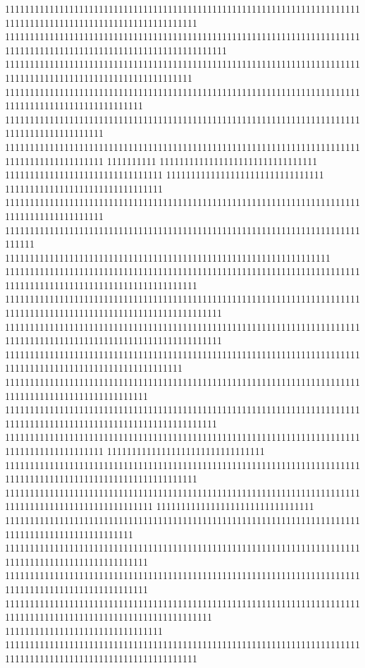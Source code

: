 111111111111111111111111111111111111111111111111111111111111111111111111111111111111111111111111111111111111111
111111111111111111111111111111111111111111111111111111111111111111111111111111111111111111111111111111111111111111111
11111111111111111111111111111111111111111111111111111111111111111111111111111111111111111111111111111111111111
1111111111111111111111111111111111111111111111111111111111111111111111111111111111111111111111111111
11111111111111111111111111111111111111111111111111111111111111111111111111111111111111111111
11111111111111111111111111111111111111111111111111111111111111111111111111111111111111111111
1111111111
11111111111111111111111111111111
11111111111111111111111111111111
11111111111111111111111111111111
11111111111111111111111111111111
11111111111111111111111111111111111111111111111111111111111111111111111111111111111111111111
111111111111111111111111111111111111111111111111111111111111111111111111111111
111111111111111111111111111111111111111111111111111111111111111111
111111111111111111111111111111111111111111111111111111111111111111111111111111111111111111111111111111111111111
11111111111111111111111111111111111111111111111111111111111111111111111111111111111111111111111111111111111111111111
11111111111111111111111111111111111111111111111111111111111111111111111111111111111111111111111111111111111111111111
111111111111111111111111111111111111111111111111111111111111111111111111111111111111111111111111111111111111
11111111111111111111111111111111111111111111111111111111111111111111111111111111111111111111111111111
1111111111111111111111111111111111111111111111111111111111111111111111111111111111111111111111111111111111111111111
11111111111111111111111111111111111111111111111111111111111111111111111111111111111111111111
11111111111111111111111111111111
111111111111111111111111111111111111111111111111111111111111111111111111111111111111111111111111111111111111111
111111111111111111111111111111111111111111111111111111111111111111111111111111111111111111111111111111
11111111111111111111111111111111
11111111111111111111111111111111111111111111111111111111111111111111111111111111111111111111111111
11111111111111111111111111111111111111111111111111111111111111111111111111111111111111111111111111111
11111111111111111111111111111111111111111111111111111111111111111111111111111111111111111111111111111
111111111111111111111111111111111111111111111111111111111111111111111111111111111111111111111111111111111111111111
11111111111111111111111111111111
111111111111111111111111111111111111111111111111111111111111111111111111111111111111111111111111111111111111111
